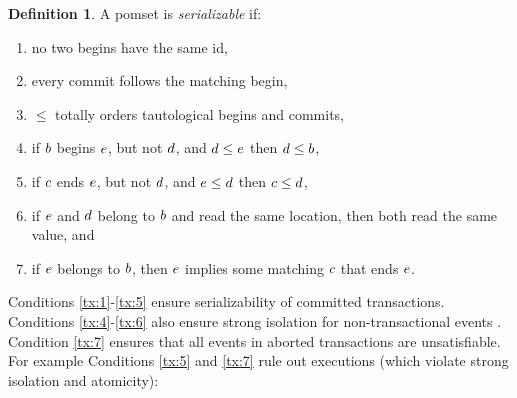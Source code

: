 \documentclass[conference]{IEEEtran}
\theoremstyle{plain}
\theoremstyle{definition}
\newtheorem{definition}[theorem]{Definition}
\begin{document}
\begin{definition}
  A pomset is \emph{serializable} if:
  \begin{enumerate}
  \item\label{tx:1} no two begins have the same id,
  \item\label{tx:2} every commit follows the matching begin,
  \item\label{tx:3} $\le$ totally orders tautological begins and commits,
  \item\label{tx:4} if $b$ begins $e$, but not $d$, and $d\le e$ then $d\le b$,
  \item\label{tx:5} if $c$ ends $e$, but not $d$, and $e\le d$ then $c\le d$,
  \item\label{tx:6} if $e$ and $d$ belong to $b$ and read the same
    location, then both read the same value, and
  \item\label{tx:7} if $e$ belongs to $b$, then $e$ implies some
    matching $c$ that ends $e$.
  \end{enumerate}
\end{definition}
%
Conditions \ref{tx:1}-\ref{tx:5} ensure serializability of committed
transactions.  Conditions \ref{tx:4}-\ref{tx:6} also ensure strong isolation
for non-transactional events
\cite{DBLP:journals/pacmpl/DongolJR18}. Condition \ref{tx:7} ensures that all
events in aborted transactions are unsatisfiable.
%
For example Conditions \ref{tx:5} and \ref{tx:7} rule out
executions (which violate strong isolation and atomicity):
\end{document}
